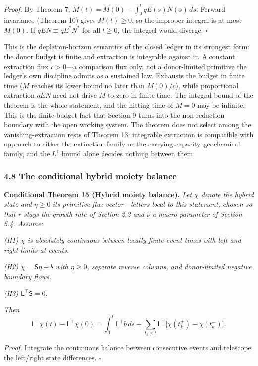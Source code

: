 \documentclass[11pt]{article}
\begin{document}
\emph{Proof.} By Theorem 7, \(M(t) = M(0) - \int_0^t qE(s)N(s)\, ds\). Forward invariance (Theorem 10) gives \(M(t) \ge 0\), so the improper integral is at most \(M(0)\). If \(qEN \equiv qE^*N^*\) for all \(t \ge 0\), the integral would diverge. \ensuremath{\square}

This is the depletion-horizon semantics of the closed ledger in its strongest form: the donor budget is finite and extraction is integrable against it. A constant extraction flux \(c > 0\)---a comparison flux only, not a donor-limited primitive the ledger's own discipline admits as a sustained law. Exhausts the budget in finite time (\(M\) reaches its lower bound no later than \(M(0)/c\)), while proportional extraction \(qEN\) need not drive \(M\) to zero in finite time. The integral bound of the theorem is the whole statement, and the hitting time of \(M = 0\) may be infinite. This is the finite-budget fact that Section 9 turns into the non-reduction boundary with the open working system. The theorem does not select among the vanishing-extraction rests of Theorem 13: integrable extraction is compatible with approach to either the extinction family or the carrying-capacity--geochemical family, and the \(L^1\) bound alone decides nothing between them.

\subsubsection{4.8 The conditional hybrid moiety
balance}\label{the-conditional-hybrid-moiety-balance}

\textbf{Conditional Theorem 15 (Hybrid moiety balance).} \emph{Let
\(\chi\) denote the hybrid state and \(\eta \ge 0\) its primitive-flux
vector---letters local to this statement, chosen so that \(r\) stays
the growth rate of Section 2.2 and \(\nu\) a macro parameter of Section
5.4. Assume:}

\emph{(H1) \(\chi\) is absolutely continuous between locally finite
event times with left and right limits at events.}

\emph{(H2) \(\dot \chi = \mathsf{S}\eta + b\) with \(\eta \ge 0\),
separate reverse columns, and donor-limited negative boundary flows.}

\emph{(H3) \(\mathsf{L}^\top \mathsf{S} = 0\).}

\emph{Then}
\[\mathsf{L}^\top \chi(t) - \mathsf{L}^\top \chi(0) = \int_0^t \mathsf{L}^\top b\, ds + \sum_{t_k \le t} \mathsf{L}^\top \bigl[ \chi(t_k^+) - \chi(t_k^-) \bigr].\]

\emph{Proof.} Integrate the continuous balance between consecutive
events and telescope the left/\allowbreak{}right state differences. \ensuremath{\square}
\end{document}
